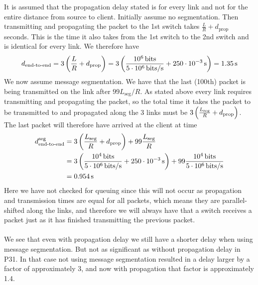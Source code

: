 It is assumed that the propagation delay stated is for every link and not for the entire distance from source to client. Initially assume no segmentation. Then transmitting and propagating the packet to the 1st switch takes $\frac{L}{R} + d_\text{prop}$ seconds. This is the time it also takes from the 1st switch to the 2nd switch and is identical for every link. We therefore have
\begin{equation*}
     d_\text{end-to-end} = 3 \left (\frac{L}{R} + d_\text{prop}\right) = 3 \left (  \frac{10^6 \, \text{bits}}{5 \cdot 10^6 \, \text{bits/s}} + 250 \cdot 10^{-3} \, \text{s}\right) = 1.35 \, \text{s}
\end{equation*}
We now assume message segmentation. We have that the last (100th) packet is being transmitted on the link after $99 L_\text{seg}/R$. As stated above every link requires transmitting and propagating the packet, so the total time it takes the packet to be transmitted to and propagated along the 3 links must be $3 \left (\frac{L_\text{seg}}{R} + d_\text{prop}\right)$. The last packet will therefore have arrived at the client at time
\begin{equation*}
\begin{split}
     d_\text{end-to-end}^{\text{seg}} &= 3 \left (\frac{L_\text{seg}}{R} + d_\text{prop}\right) + 99 \frac{L_\text{seg}}{R} \\
     &= 3 \left (  \frac{10^4 \, \text{bits}}{5 \cdot 10^6 \, \text{bits/s}} + 250 \cdot 10^{-3} \, \text{s}\right) + 99  \frac{10^4 \, \text{bits}}{5 \cdot 10^6 \, \text{bits/s}} \\
     &= 0.954 \, \text{s}
\end{split}
\end{equation*}
Here we have not checked for queuing since this will not occur as propagation and transmission times are equal for all packets, which means they are parallel-shifted along the links, and therefore we will always have that a switch receives a packet just as it has finished transmitting the previous packet. \\
\\
We see that even with propagation delay we still have a shorter delay when using message segmentation. But not as significant as without propagation delay in P31. In that case not using message segmentation resulted in a delay larger by a factor of approximately 3, and now with propagation that factor is approximately 1.4.


